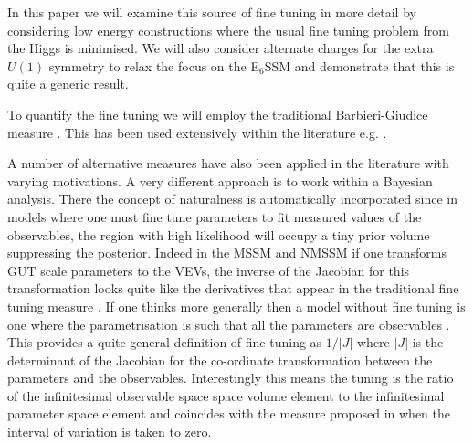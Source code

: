 \documentclass[preprint,amsmath,amssymb,aps,superscriptaddress,prd,showpacs,floatfix]{revtex4-1}
\begin{document}
In this paper we will examine this source of fine tuning in more detail by considering low energy constructions where the usual fine tuning problem from the Higgs is minimised.   We will also consider  alternate charges for the extra $U(1)$ symmetry to relax the focus on the E$_6$SSM and demonstrate that this is quite a generic result.

To quantify the fine tuning we will employ the traditional
Barbieri-Giudice measure \cite{Ellis:1986yg,Barbieri:1987fn}.  This has
been used extensively within the literature
e.g. \cite{deCarlos:1993yy, deCarlos:1993ca, Chankowski:1997zh, Agashe:1997kn, Wright:1998mk, Kane:1998im, BasteroGil:1999gu, Feng:1999zg, Allanach:2000ii, Dermisek:2005ar, Barbieri:2005kf, Allanach:2006jc, Gripaios:2006nn, Dermisek:2006py, Barbieri:2006dq, Kobayashi:2006fh, Perelstein:2012qg, Antusch:2012gv,Cheng:2012pe, CahillRowley:2012rv, Ross:2012nr, Basak:2012bd, Kang:2012sy, Athron:2013ipa,Miller:2013jra, Binjonaid:2014oga, Miller:2014jza}.

A number of alternative measures have also been applied in the
literature \cite{Anderson:1994dz, Anderson:1994tr,
  Anderson:1995cp,Anderson:1996ew,Ciafaloni:1996zh,Chan:1997bi,
  Barbieri:1998uv,
  Giusti:1998gz,Casas:2003jx,Casas:2004uu,Casas:2004gh,Casas:2006bd,Kitano:2005wc,
  Athron:2007ry, Athron:2007qr, Baer:2012up} with varying motivations.
A very different approach is to work within a Bayesian analysis.
There the concept of naturalness is automatically incorporated since
in models where one must fine tune parameters to fit measured values
of the observables, the region with high likelihood will occupy a tiny
prior volume \cite{Allanach:2007qk, Cabrera:2008tj, Ghilencea:2012gz,
  Ghilencea:2012qk, Fichet:2012sn, Kim:2013uxa} suppressing the
posterior.  Indeed in the MSSM and NMSSM if one transforms GUT scale
parameters to the VEVs, the inverse of the Jacobian for this
transformation looks quite like the derivatives that appear in the
traditional fine tuning measure \cite{Allanach:2007qk, Cabrera:2008tj,
  Kim:2013uxa}.  If one thinks more generally then a model without
fine tuning is one where the parametrisation is such that all the
parameters are observables \cite{Fichet:2012sn, Kim:2013uxa}.  This
provides a quite general definition of fine tuning as $1/|J|$ where
$|J|$ is the determinant of the Jacobian for the co-ordinate
transformation between the parameters and the
observables. Interestingly this means the tuning is the ratio of the
infinitesimal observable space space volume element to the
infinitesimal parameter space element and coincides with the measure
proposed in \cite{Athron:2007ry} when the interval of variation is
taken to zero.
\end{document}
